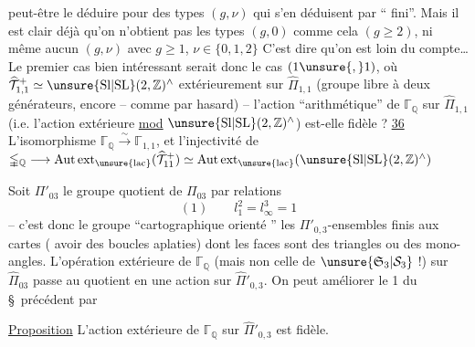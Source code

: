 peut-être le déduire pour des types $(g,\nu)$
qui s'en déduisent par `` fini''.
Mais il est clair déjà qu'on n'obtient
pas les types $(g,0)$ comme cela $(g\geq 2)$,
ni même aucun $(g,\nu)$ avec $g\geq 1$, $\nu\in\{0,1,2\}$
C'est dire qu'on est loin du compte\ldots
Le premier cas bien intéressant serait
donc le cas $(1\unsure{,}1)$, où
$\widehat{\mathcal{T}}_{1,1}^{+}\simeq
\unsure{\mathrm{Sl}|\mathrm{SL}}(2,\mathbb{Z})^{\wedge}$
 extérieurement sur $\widehat{\Pi}_{1,1}$
(groupe libre à deux générateurs, encore
-- comme par hasard) -- l'action
``arithmétique'' de $\mathbb{\Gamma}_{\mathbb{Q}}$ sur $\widehat{\Pi}_{1,1}$
(i.e. l'action extérieure \uline{mod}
$\unsure{\mathrm{Sl}|\mathrm{SL}}(2,\mathbb{Z})^{\wedge}$)
est-elle fidèle ?
\uline{36} L'isomorphisme
$\mathbb{\Gamma}_{\mathbb{Q}}\xrightarrow{\sim}\mathbb{\Gamma}_{1,1}$,
et l'injectivité de
$\mathbb{\Gamma}_{\mathbb{Q}}\longrightarrow
\mathrm{Aut\,ext}_{\unsure{\mathrm{lac}}}(\widehat{\mathcal{T}}_{11}^{+})
\simeq\mathrm{Aut\,ext}_{\unsure{\mathrm{lac}}}(\unsure{\mathrm{Sl}|\mathrm{SL}}(2,\mathbb{Z})^{\wedge})$

Soit $\Pi'_{03}$ le groupe quotient de $\Pi_{03}$
 par  relations
\[
(1)\qquad l_1^2=l_\infty^3=1
\]
-- c'est donc le groupe ``cartographique
orienté ''\unsure{,|;}
 les $\Pi'_{0,3}$-ensembles
finis   aux cartes
  ( avoir des
boucles aplaties) dont les faces sont des
triangles ou des mono-angles. L'opération
extérieure de $\mathbb{\Gamma}_{\mathbb{Q}}$
(mais non celle de $\unsure{\mathfrak{S}_3|\mathcal{S}_3}$ !)
sur $\widehat{\Pi}_{03}$ passe au quotient en une
action sur $\widehat{\Pi}'_{0,3}$. On peut améliorer le
 1 du \S\ précédent par 

\uline{Proposition} L'action extérieure de $\mathbb{\Gamma}_{\mathbb{Q}}$
sur $\widehat{\Pi}'_{0,3}$ est fidèle.

